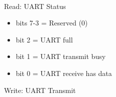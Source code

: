 \\
Read: UART Status\\
\begin{itemize}
\item[] bits 7-3 = Reserved (0)
\item[] bit 2 = UART full
\item[] bit 1 = UART transmit busy
\item[] bit 0 = UART receive has data
\end{itemize}
Write: UART Transmit

